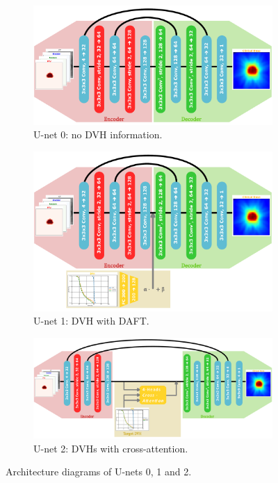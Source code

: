 \begin{figure}
	\centering
	\vspace{-0.5cm}
	\begin{subfigure}{\linewidth}
		\centering
		\includegraphics[width=12cm]{SFRO/model0.pdf}
		\caption{U-net 0: no DVH information.}
		\label{fig:unet0}
	\end{subfigure}
	\vspace{0.5cm}
	
	\begin{subfigure}{\linewidth}
		\centering
		\includegraphics[width=12cm]{SFRO/model1.pdf}
		\caption{U-net 1: DVH with DAFT.}
		\label{fig:unet1}
	\end{subfigure}
	\vspace{0.5cm}
	
	\begin{subfigure}{\linewidth}
		\centering
		\includegraphics[width=12cm]{SFRO/model2.pdf}
		\caption{U-net 2: DVHs with cross-attention.}
		\label{fig:unet2}
	\end{subfigure}
	\caption{Architecture diagrams of U-nets 0, 1 and 2.}
	\label{fig:unets012}
\end{figure}

